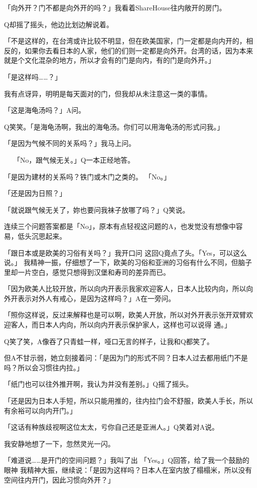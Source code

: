 \documentclass{article}
\begin{document}
「向外开？门不都是向外开的吗？」我看着ShareHouse往内敞开的房门。 

Q却摇了摇头，他边比划边解说着。 

「不是这样的，在台湾或许比较不明显，但在欧美国家，门一定都是向内开的，相反的，如果你去看日本的人家，他们的们则一定都是向外开。台湾的话，因为本来就是个文化混杂的地方，所以才会有的门是向内，有的门是向外开。」 

「是这样吗……？」 

我有点讶异，明明是每天面对的门，但我却从未注意这一类的事情。 

「这是海龟汤吗？」A问。 

Q笑笑。「是海龟汤啊，我出的海龟汤。你们可以用海龟汤的形式问我。」 

「是因为气候不同的关系吗？」我马上问。
\newpage

　
「No，跟气候无关。」Q一本正经地答。 

「是因为建材的关系吗？铁门或木门之类的。
「No。」 

「还是因为日照？」 

「就说跟气候无关了，妳也要问我袜子放哪了吗？」Q笑说。 

连续三个问题答案都是「No」，原本有点轻视这问题的A，也发觉没有想像中容易，低头沉思起来。 

「跟日本或是欧美的习俗有关吗？」我开口问
这回Q竟点了头。「Yes，可以这么说。」
我精神一振，仔细想了一下，欧美的习俗和亚洲的习俗有什么不同，但脑子里却一片空白，感觉只想得到汉堡和寿司的差异而已。 

「因为欧美人比较开放，所以向内开表示我家欢迎客人，日本人比较内向，所以向外开表示对外人有戒心，是因为这样吗？」A在一旁问。 

「照你这样说，反过来解释也是可以啊，欧美人开放，所以对外开表示张开双臂欢迎客人，而日本人内向，所以向内开表示保护家人，这样也可以说得
\newpage
通。」 

Q笑了笑，A像吞了只青蛙一样，哑口无言的样子，让我和Q都笑了。 

但A不甘示弱，她立刻接着问：「是因为门的形式不同？日本人过去都用纸门不是吗？所以会习惯往内拉。」 

「纸门也可以往外推开啊，我认为并没有差别。」Q摇了摇头。 

「还是因为日本人手短，所以只能用推的，往内拉门会不舒服，欧美人手长，所以有余裕可以向内开门。」 

「这话有种族歧视啊这位太太，亏你自己还是亚洲人。」Q笑着对A说。 

我安静地想了一下，忽然灵光一闪。 

「难道说……是开门的空间问题？」我叫了出
「Yes。」Q回答，给了我一个鼓励的眼神
我精神大振，继续说：「是因为这样吗？日本人在室内放了榻榻米，所以没有空间往内开门，因此习惯向外开？」 
\end{document}
